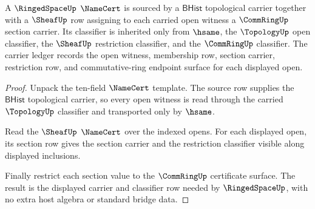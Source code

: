 \begin{theorem}\label{thm:ringedspace-carrier-sheaf-obligation}
A $\RingedSpaceUp$ $\NameCert$ is sourced by a $\mathsf{BHist}$ topological carrier together with a $\SheafUp$ row assigning to each carried open witness a $\CommRingUp$ section carrier. Its classifier is inherited only from $\hsame$, the $\TopologyUp$ open classifier, the $\SheafUp$ restriction classifier, and the $\CommRingUp$ classifier. The carrier ledger records the open witness, membership row, section carrier, restriction row, and commutative-ring endpoint surface for each displayed open.
\end{theorem}
\begin{proof}
Unpack the ten-field $\NameCert$ template. The source row supplies the $\mathsf{BHist}$ topological carrier, so every open witness is read through the carried $\TopologyUp$ classifier and transported only by $\hsame$.

Read the $\SheafUp$ $\NameCert$ over the indexed opens. For each displayed open, its section row gives the section carrier and the restriction classifier visible along displayed inclusions.

Finally restrict each section value to the $\CommRingUp$ certificate surface. The result is the displayed carrier and classifier row needed by $\RingedSpaceUp$, with no extra host algebra or standard bridge data.
\end{proof}

